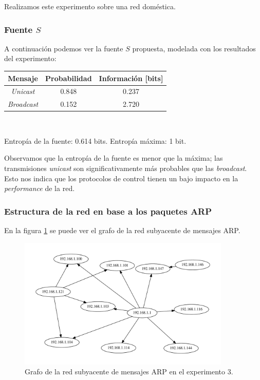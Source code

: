 \par Realizamos este experimento sobre una red doméstica.

\subsubsection{Fuente $S$}

\par A continuación podemos ver la fuente $S$ propuesta, modelada con los resultados del experimento: \\

\begin{tabular}{ | c | c | c |}
    \hline
    Mensaje & Probabilidad & Información [bits] \\
    \hline
    \textit{Unicast} & 0.848 & 0.237 \\
    \hline
    \textit{Broadcast} & 0.152 & 2.720 \\
    \hline
\end{tabular} \\

\par Entropía de la fuente: 0.614 bits. Entropía máxima: 1 bit.

\par Observamos que la entropía de la fuente es menor que la máxima; las transmisiones \textit{unicast} son significativamente más probables que las \textit{broadcast}.
Esto nos indica que los protocolos de control tienen un bajo impacto en la \textit{performance} de la red.

\subsubsection{Estructura de la red en base a los paquetes ARP}

\par En la figura \ref{ARPcasa} se puede ver el grafo de la red subyacente de mensajes ARP.

\begin{figure}[ht]
    \centering
    \includegraphics[width=0.9\textwidth]{figuras/casa_grafo.pdf}
    \caption{Grafo de la red subyacente de mensajes ARP en el experimento 3.}\label{ARPcasa}
\end{figure}

